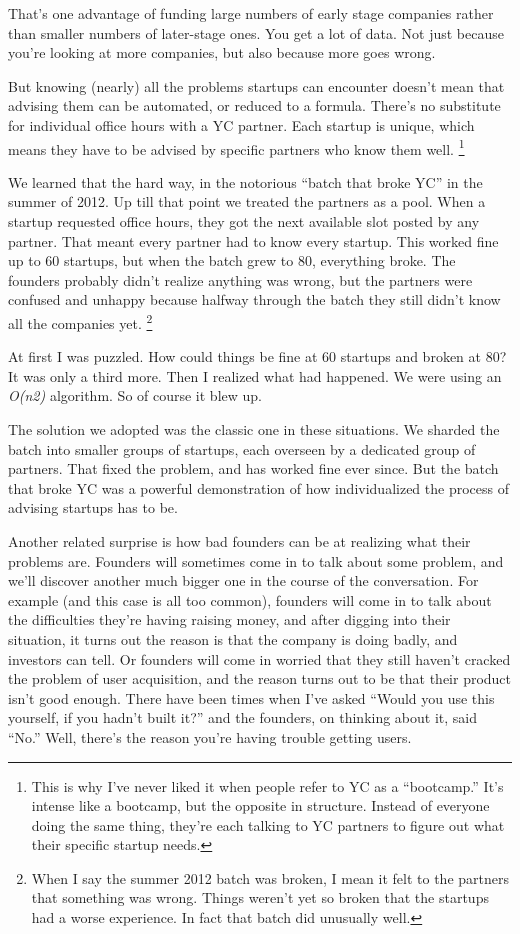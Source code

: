 \documentclass[12pt]{book}
\begin{document}
That's one advantage of funding large numbers of early stage companies
rather than smaller numbers of later-stage ones. You get a lot of data.
Not just because you're looking at more companies, but also because more
goes wrong.

But knowing (nearly) all the problems startups can encounter doesn't
mean that advising them can be automated, or reduced to a formula.
There's no substitute for individual office hours with a YC partner.
Each startup is unique, which means they have to be advised by specific
partners who know them well. \footnote{This is why I've never liked it when people refer to YC as a
``bootcamp.'' It's intense like a bootcamp, but the opposite in
structure. Instead of everyone doing the same thing, they're each
talking to YC partners to figure out what their specific startup needs.}

We learned that the hard way, in the notorious ``batch that broke YC''
in the summer of 2012. Up till that point we treated the partners as a
pool. When a startup requested office hours, they got the next available
slot posted by any partner. That meant every partner had to know every
startup. This worked fine up to 60 startups, but when the batch grew to
80, everything broke. The founders probably didn't realize anything was
wrong, but the partners were confused and unhappy because halfway
through the batch they still didn't know all the companies yet.
\footnote{When I say the summer 2012 batch was broken, I mean it felt to
the partners that something was wrong. Things weren't yet so broken that
the startups had a worse experience. In fact that batch did unusually
well.}

At first I was puzzled. How could things be fine at 60 startups and
broken at 80? It was only a third more. Then I realized what had
happened. We were using an \emph{O(n2)} algorithm. So of course it blew
up.

The solution we adopted was the classic one in these situations. We
sharded the batch into smaller groups of startups, each overseen by a
dedicated group of partners. That fixed the problem, and has worked fine
ever since. But the batch that broke YC was a powerful demonstration of
how individualized the process of advising startups has to be.

Another related surprise is how bad founders can be at realizing what
their problems are. Founders will sometimes come in to talk about some
problem, and we'll discover another much bigger one in the course of the
conversation. For example (and this case is all too common), founders
will come in to talk about the difficulties they're having raising
money, and after digging into their situation, it turns out the reason
is that the company is doing badly, and investors can tell. Or founders
will come in worried that they still haven't cracked the problem of user
acquisition, and the reason turns out to be that their product isn't
good enough. There have been times when I've asked ``Would you use this
yourself, if you hadn't built it?'' and the founders, on thinking about
it, said ``No.'' Well, there's the reason you're having trouble getting
users.
\end{document}
